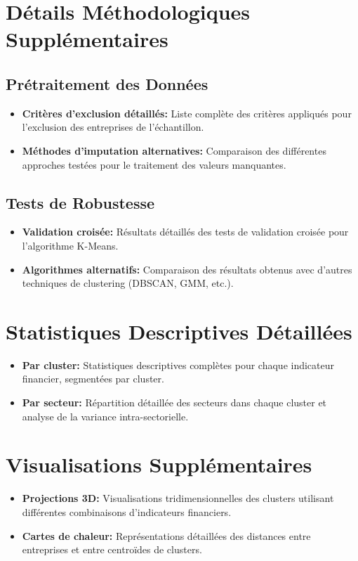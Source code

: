 \documentclass[12pt]{article}
\begin{document}
\begin{appendices}
\section{Détails Méthodologiques Supplémentaires}
\subsection{Prétraitement des Données}
\begin{itemize}
    \item \textbf{Critères d'exclusion détaillés:} Liste complète des critères appliqués pour l'exclusion des entreprises de l'échantillon.
    \item \textbf{Méthodes d'imputation alternatives:} Comparaison des différentes approches testées pour le traitement des valeurs manquantes.
\end{itemize}

\subsection{Tests de Robustesse}
\begin{itemize}
    \item \textbf{Validation croisée:} Résultats détaillés des tests de validation croisée pour l'algorithme K-Means.
    \item \textbf{Algorithmes alternatifs:} Comparaison des résultats obtenus avec d'autres techniques de clustering (DBSCAN, GMM, etc.).
\end{itemize}

\section{Statistiques Descriptives Détaillées}
\begin{itemize}
    \item \textbf{Par cluster:} Statistiques descriptives complètes pour chaque indicateur financier, segmentées par cluster.
    \item \textbf{Par secteur:} Répartition détaillée des secteurs dans chaque cluster et analyse de la variance intra-sectorielle.
\end{itemize}

\section{Visualisations Supplémentaires}
\begin{itemize}
    \item \textbf{Projections 3D:} Visualisations tridimensionnelles des clusters utilisant différentes combinaisons d'indicateurs financiers.
    \item \textbf{Cartes de chaleur:} Représentations détaillées des distances entre entreprises et entre centroïdes de clusters.
\end{itemize}
\end{appendices}
\end{document}
